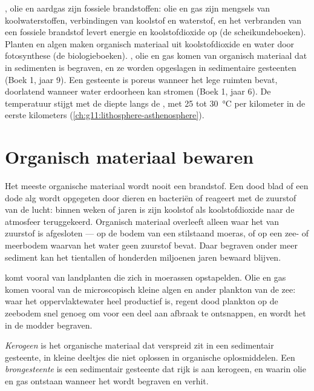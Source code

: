 \begin{recall}
, olie en aardgas zijn fossiele brandstoffen: olie en gas zijn mengsels van
koolwaterstoffen, verbindingen van koolstof en waterstof, en het verbranden van een fossiele brandstof
levert energie en koolstofdioxide op (de scheikundeboeken). Planten en algen
maken organisch materiaal uit koolstofdioxide en water door fotosynthese (de
biologieboeken). , olie en gas komen van organisch materiaal dat in
sedimenten is begraven, en ze worden opgeslagen in sedimentaire gesteenten (Boek 1, jaar 9). Een gesteente
is poreus wanneer het lege ruimten bevat, doorlatend wanneer water erdoorheen kan
stromen (Boek 1, jaar 6). De temperatuur stijgt met de diepte langs de ,
met 25 tot \qty{30}{\degreeCelsius} per kilometer in de eerste kilometers
(\cref{ch:g11:lithosphere-asthenosphere}).
\end{recall}

\section{Organisch materiaal bewaren}

Het meeste organische materiaal wordt nooit een brandstof. Een dood blad of een dode alg wordt
opgegeten door dieren en bacteriën of reageert met de zuurstof van de lucht: binnen
weken of jaren is zijn koolstof als koolstofdioxide naar de atmosfeer teruggekeerd.
Organisch materiaal overleeft alleen waar het van zuurstof is afgesloten --- op de
bodem van een stilstaand moeras, of op een zee- of meerbodem waarvan het water geen
zuurstof bevat. Daar begraven onder meer sediment kan het tientallen of
honderden miljoenen jaren bewaard blijven.

 komt vooral van landplanten die zich in moerassen opstapelden. Olie en gas komen
vooral van de microscopisch kleine algen en ander plankton van de zee: waar het
oppervlaktewater heel productief is, regent dood plankton op de zeebodem
snel genoeg om voor een deel aan afbraak te ontsnappen, en wordt het in de modder begraven.

\begin{definition}\label{def:g11:fossil-fuel-geology:source-rock}
\emph{Kerogeen} is het organische materiaal dat verspreid zit in een
sedimentair gesteente, in kleine deeltjes die niet oplossen in organische
oplosmiddelen. Een \emph{brongesteente} is een sedimentair gesteente dat rijk
is aan kerogeen, en waarin olie en gas ontstaan wanneer het wordt begraven en verhit.
\end{definition}

